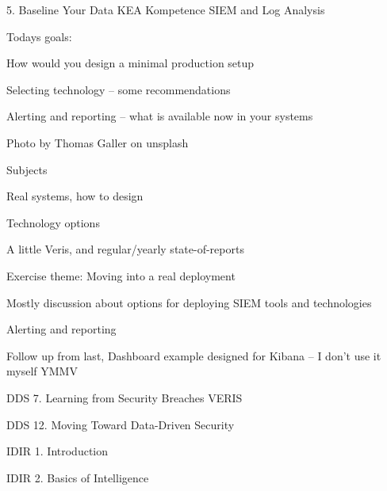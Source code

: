 \documentclass[Screen16to9,17pt]{foils}
\begin{document}
\mytitlepage
{5. Baseline Your Data}
{KEA Kompetence SIEM and Log Analysis}




Todays goals:
\begin{list2}
\item How would you design a minimal production setup
\item Selecting technology -- some recommendations
\item Alerting and reporting -- what is available now in your systems
\end{list2}

  Photo by Thomas Galler on unsplash


\begin{list1}
\item Subjects
\begin{list2}
\item Real systems, how to design
\item Technology options
\item A little Veris, and regular/yearly state-of-reports
\end{list2}
\item Exercise theme: Moving into a real deployment
\begin{list2}
\item Mostly discussion about options for deploying SIEM tools and technologies
\item Alerting and reporting
\end{list2}
\end{list1}

Follow up from last, Dashboard example designed for Kibana -- I don't use it myself YMMV\\


\begin{list1}
\item DDS 7. Learning from Security Breaches VERIS
\item DDS 12. Moving Toward Data-Driven Security
\item IDIR 1. Introduction
\item IDIR 2. Basics of Intelligence
\end{list1}


\end{document}
